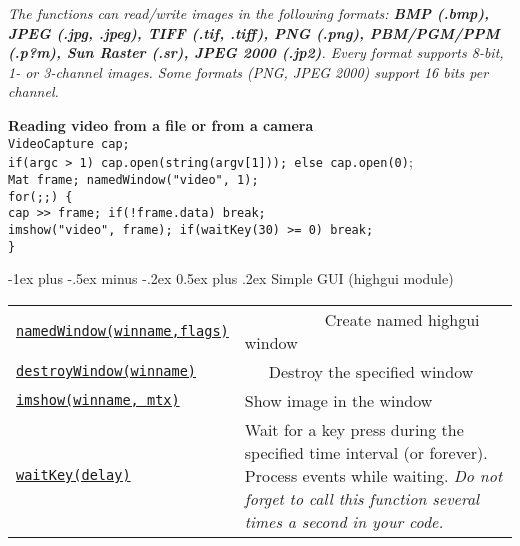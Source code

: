 \documentclass[10pt,landscape]{article}
\makeatletter
\renewcommand{\section}{\@startsection{section}{1}{0mm}%
                                {-1ex plus -.5ex minus -.2ex}%
                                {0.5ex plus .2ex}%
                                {\normalfont\large\bfseries}}
\makeatother
\begin{document}
\begin{multicols}{3}
\emph{The functions can read/write images in the following formats: \textbf{BMP (.bmp), JPEG (.jpg, .jpeg), TIFF (.tif, .tiff), PNG (.png), PBM/PGM/PPM (.p?m), Sun Raster (.sr), JPEG 2000 (.jp2)}. Every format supports 8-bit, 1- or 3-channel images. Some formats (PNG, JPEG 2000) support 16 bits per channel.}

\begin{tabbing}
\textbf{Re}\=\textbf{ading video from a file or from a camera}\\
\texttt{VideoCapture cap;}\\
\texttt{if(argc > 1) cap.open(string(argv[1])); else cap.open(0)};\\
\texttt{Mat frame; namedWindow("video", 1);}\\
\texttt{for(;;) \{}\\
\>\texttt{cap >> frame; if(!frame.data) break;}\\
\>\texttt{imshow("video", frame); if(waitKey(30) >= 0) break;}\\
\texttt{\} }
\end{tabbing}

\section{Simple GUI (highgui module)}

\begin{tabular}{@{}p{\the\MyLen}%
                @{}p{\linewidth-\the\MyLen}@{}}

\texttt{\href{http://opencv.willowgarage.com/documentation/cpp/highgui_user_interface.html\#cv-namedwindow}{namedWindow(winname,flags)}} & \ \ \ \ \ \ \ \ \ \ Create named highgui window \\

\texttt{\href{http://opencv.willowgarage.com/documentation/cpp/highgui_user_interface.html\#cv-destroywindow}{destroyWindow(winname)}} & \ \ \ Destroy the specified window \\

\texttt{\href{http://opencv.willowgarage.com/documentation/cpp/highgui_user_interface.html\#cv-imshow}{imshow(winname, mtx)}} & Show image in the window \\

\texttt{\href{http://opencv.willowgarage.com/documentation/cpp/highgui_user_interface.html\#cv-waitKey}{waitKey(delay)}} & Wait for a key press during the specified time interval (or forever). Process events while waiting. \emph{Do not forget to call this function several times a second in your code.} \\


\end{tabular}
\end{multicols}
\end{document}
